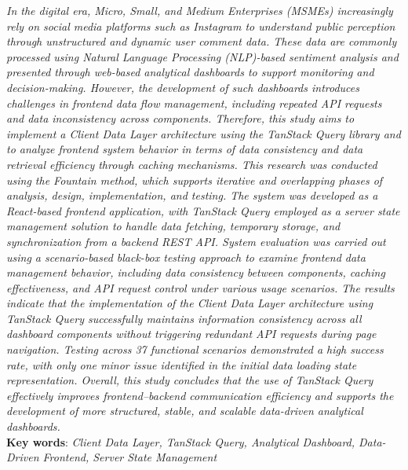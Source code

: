 \textit{In the digital era, Micro, Small, and Medium Enterprises (MSMEs) increasingly rely on social media platforms such as Instagram to understand public perception through unstructured and dynamic user comment data. These data are commonly processed using Natural Language Processing (NLP)-based sentiment analysis and presented through web-based analytical dashboards to support monitoring and decision-making. However, the development of such dashboards introduces challenges in frontend data flow management, including repeated API requests and data inconsistency across components. Therefore, this study aims to implement a Client Data Layer architecture using the TanStack Query library and to analyze frontend system behavior in terms of data consistency and data retrieval efficiency through caching mechanisms. This research was conducted using the Fountain method, which supports iterative and overlapping phases of analysis, design, implementation, and testing. The system was developed as a React-based frontend application, with TanStack Query employed as a server state management solution to handle data fetching, temporary storage, and synchronization from a backend REST API. System evaluation was carried out using a scenario-based black-box testing approach to examine frontend data management behavior, including data consistency between components, caching effectiveness, and API request control under various usage scenarios. The results indicate that the implementation of the Client Data Layer architecture using TanStack Query successfully maintains information consistency across all dashboard components without triggering redundant API requests during page navigation. Testing across 37 functional scenarios demonstrated a high success rate, with only one minor issue identified in the initial data loading state representation. Overall, this study concludes that the use of TanStack Query effectively improves frontend–backend communication efficiency and supports the development of more structured, stable, and scalable data-driven analytical dashboards.}\\[0.6cm]

\noindent \textbf{Key words}: \textit{Client Data Layer, TanStack Query, Analytical Dashboard, Data-Driven Frontend, Server State Management}
